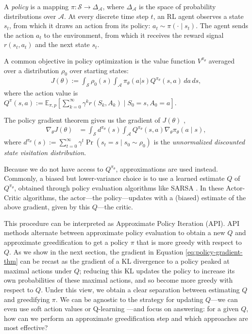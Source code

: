 \documentclass[twoside,11pt]{article}
\newcommand{\Ex}{\mathbb{E}}
\newcommand{\statespace}{\mathcal{S}}
\newcommand{\actionspace}{\mathcal{A}}
\newcommand{\Qhat}{{Q}}
\newcommand{\policyparams}{\theta}
\newcommand{\defeq}{:=}
\begin{document}
A \textit{policy} is a mapping $\pi : \statespace \to \Delta_\actionspace$, where $\Delta_\actionspace$ is the space of probability distributions over $\actionspace$. 
%
At every discrete time step $t$, an RL agent observes a state $s_t$, from which it draws an action from its policy: $a_t \sim \pi(\cdot \mid s_t)$. The agent sends the action $a_t$ to the environment, from which it receives the reward signal $r(s_t, a_t)$ and the next state $s_t$. 

A common objective in policy optimization is the value function $V^{\pi_\theta}$ averaged over a distribution $\rho_0$ over starting states: 
\begin{align*}
J(\policyparams) \defeq \int_{\statespace} \rho_0(s) \int_{\actionspace} \pi_\policyparams(a | s) Q^{\pi_\policyparams}(s, a) \, da \, ds,
\end{align*}
where the action value is $Q^{\pi}(s,a) \defeq \Ex_{\pi, p}\left[ \sum_{k = 0}^\infty \gamma^k r(S_k, A_k) \mid S_0 = s, A_0 = a \right]$.


The {policy gradient theorem} gives us the gradient of $J(\policyparams)$ \citep{sutton2000policy},
\begin{align}\label{eq:policy-gradient-thm}
    \nabla_\policyparams J(\policyparams) &= \int_{\statespace} d^{\pi_\policyparams}(s) \int_{\actionspace} Q^{\pi_\policyparams}(s, a) \nabla_\policyparams \pi_\policyparams(a \mid s),
\end{align}
%
where $d^{\pi_\policyparams}(s) \defeq \!\sum_{t = 0}^\infty \!\gamma^t \Pr(s_t = s \!\mid\! s_0\! \sim \rho_0\!)$ is the \textit{unnormalized discounted state visitation distribution}. 

Because we do not have access to $Q^{\pi_\policyparams}$, approximations are used instead. 
Commonly, a biased but lower-variance choice is to use a learned estimate $\Qhat$ of $Q^{\pi_\policyparams}$, obtained through policy evaluation algorithms like SARSA \citep{sutton2018reinforcement}. In these Actor-Critic algorithms, the actor---the policy---updates with a (biased) estimate of the above gradient, given by this $\Qhat$---the critic. 

This procedure can be interpreted as Approximate Policy Iteration (API). API methods alternate between approximate policy evaluation to obtain a new $\Qhat$ and approximate greedification to get a policy $\pi$ that is more greedy with respect to $\Qhat$. As we show in the next section, the gradient in Equation \eqref{eq:policy-gradient-thm} can be recast as the gradient of a KL divergence to a policy peaked at maximal actions under $\Qhat$; reducing this KL updates the policy to increase its own probabilities of these maximal actions, and so become more greedy with respect to $\Qhat$. Under this view, we obtain a clear separation between estimating $\Qhat$ and greedifying $\pi$. We can be agnostic to the strategy for updating $\Qhat$---we can even use soft action values \citep{ziebart2010modeling} or Q-learning \citep{watkins1992q}---and focus on answering: for a given $\Qhat$, how can we perform an approximate greedification step and which approaches are most effective? 
   
\end{document}
